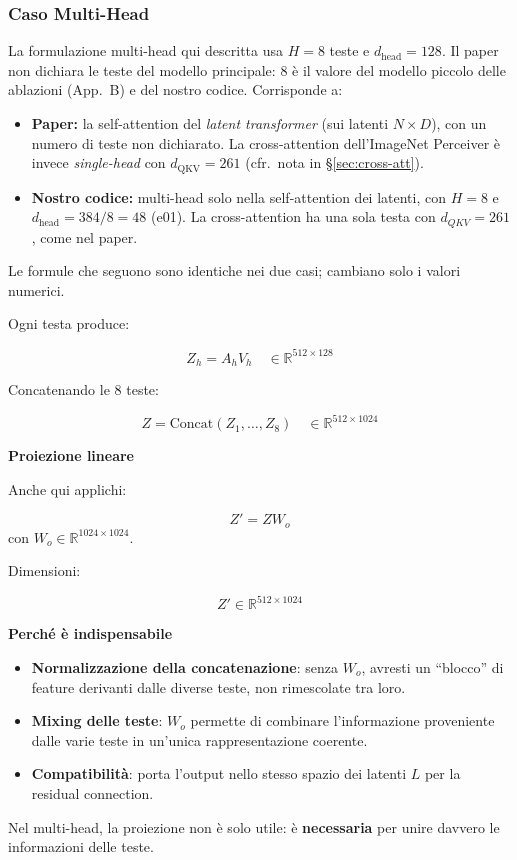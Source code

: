 \documentclass[
  11pt,
]{article}
\begin{document}
\subsubsection{Caso Multi-Head}

\begin{notabox}[title={\textbf{A quale modulo si riferisce questa sezione?}}]
La formulazione multi-head qui descritta usa $H = 8$ teste e $d_{\text{head}} = 128$. Il paper non dichiara le teste del modello principale: 8 è il valore del modello piccolo delle ablazioni (App.~B) e del nostro codice. Corrisponde a:
\begin{itemize}
\item \textbf{Paper:} la self-attention del \emph{latent transformer} (sui latenti $N \times D$), con un numero di teste non dichiarato. La cross-attention dell'ImageNet Perceiver è invece \emph{single-head} con $d_{\text{QKV}} = 261$ (cfr.\ nota in \S\ref{sec:cross-att}).
\item \textbf{Nostro codice:} multi-head solo nella self-attention dei latenti, con $H = 8$ e $d_{\text{head}} = 384/8 = 48$ (e01). La cross-attention ha una sola testa con $d_{QKV} = 261$, come nel paper.
\end{itemize}
Le formule che seguono sono identiche nei due casi; cambiano solo i valori numerici.
\end{notabox}

Ogni testa produce:

\[
Z_h = A_h V_h \quad \in \mathbb{R}^{512 \times 128}
\]

Concatenando le 8 teste:

\[
Z = \text{Concat}(Z_1, \ldots, Z_8) \quad \in \mathbb{R}^{512 \times 1024}
\]

\textbf{Proiezione lineare}

Anche qui applichi:

\[
Z' = Z W_o
\]
con $W_o \in \mathbb{R}^{1024 \times 1024}$.

Dimensioni:

\[
Z' \in \mathbb{R}^{512 \times 1024}
\]

\textbf{Perché è indispensabile}
\begin{itemize}
\item \textbf{Normalizzazione della concatenazione}: senza $W_o$, avresti un ``blocco'' di feature derivanti dalle diverse teste, non rimescolate tra loro.
\item \textbf{Mixing delle teste}: $W_o$ permette di combinare l'informazione proveniente dalle varie teste in un'unica rappresentazione coerente.
\item \textbf{Compatibilità}: porta l'output nello stesso spazio dei latenti $L$ per la residual connection.
\end{itemize}
Nel multi-head, la proiezione non è solo utile: è \textbf{necessaria} per unire davvero le informazioni delle teste.
\end{document}

